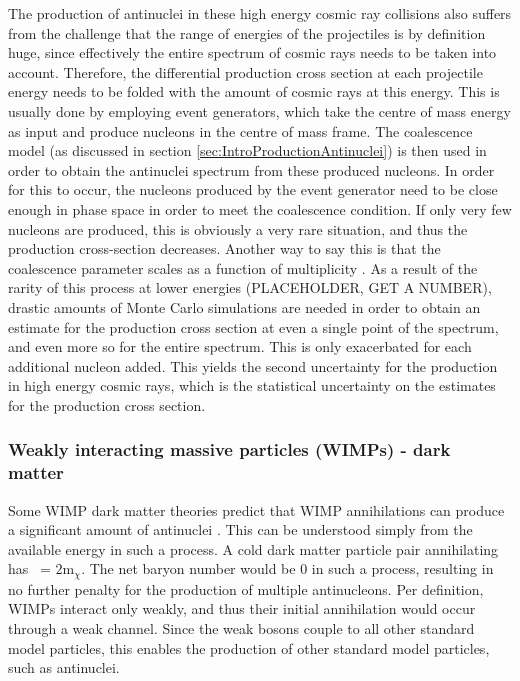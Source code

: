 The production of antinuclei in these high energy cosmic ray collisions also suffers from the challenge that the range of energies of the projectiles is by definition huge, since effectively the entire spectrum of cosmic rays needs to be taken into account. Therefore, the differential production cross section at each projectile energy needs to be folded with the amount of cosmic rays at this energy. This is usually done by employing event generators, which take the centre of mass energy as input and produce nucleons in the centre of mass frame. The coalescence model (as discussed in section \ref{sec:IntroProductionAntinuclei}) is then used in order to obtain the antinuclei spectrum from these produced nucleons. In order for this to occur, the nucleons produced by the event generator need to be close enough in phase space in order to meet the coalescence condition. If only very few nucleons are produced, this is obviously a very rare situation, and thus the production cross-section decreases. Another way to say this is that the coalescence parameter scales as a function of multiplicity \cite{}. As a result of the rarity of this process at lower energies (PLACEHOLDER, GET A NUMBER), drastic amounts of Monte Carlo simulations are needed in order to obtain an estimate for the production cross section at even a single point of the spectrum, and even more so for the entire spectrum. This is only exacerbated for each additional nucleon added. This yields the second uncertainty for the production in high energy cosmic rays, which is the statistical uncertainty on the estimates for the production cross section.\\

\subsubsection{Weakly interacting massive particles (WIMPs) - dark matter}\label{sec:WIMPS}
Some WIMP dark matter theories predict that WIMP annihilations can produce a significant amount of antinuclei \cite{}. This can be understood simply from the available energy in such a process. A cold dark matter particle pair annihilating has \Vs\ = $2\mathrm{m}_\chi$. The net baryon number would be 0 in such a process, resulting in no further penalty for the production of multiple antinucleons. Per definition, WIMPs interact only weakly, and thus their initial annihilation would occur through a weak channel. Since the weak bosons couple to all other standard model particles, this enables the production of other  standard model particles, such as antinuclei. \\

